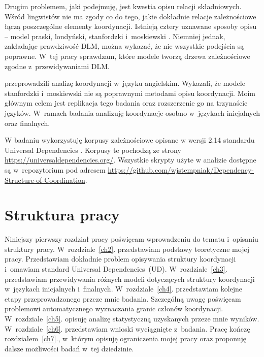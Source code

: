 Drugim problemem, jaki podejmuję, jest kwestia opisu relacji składniowych. Wśród lingwistów nie ma zgody co do tego, jakie dokładnie relacje zależnościowe łączą poszczególne elementy koordynacji. Istnieją cztery uznawane sposoby opisu -- model praski, londyński, stanfordzki i~moskiewski \citep{popel2013coordination, przepiorkowski2023conjunct}. Niemniej jednak, zakładając prawdziwość DLM, można wykazać, że nie wszystkie podejścia są poprawne. W~tej pracy sprawdzam, które modele tworzą drzewa zależnościowe zgodne z~przewidywaniami DLM.

\cite{przepiorkowski2023conjunct} przeprowadzili analizę koordynacji w~języku angielskim. Wykazali, że modele stanfordzki i~moskiewski nie są poprawnymi metodami opisu koordynacji. Moim głównym celem jest replikacja tego badania oraz rozszerzenie go na trzynaście języków. W~ramach badania analizuję koordynacje osobno w~językach inicjalnych oraz finalnych.

W badaniu wykorzystuję korpusy zależnościowe opisane w wersji 2.14 standardu Universal Dependencies \citep{de2021universal}. Korpusy te pochodzą ze strony \url{https://universaldependencies.org/}. 
Wszystkie skrypty użyte w analizie dostępne są w~repozytorium pod adresem \url{https://github.com/wjstempniak/Dependency-Structure-of-Coordination}.

\section{Struktura pracy}

Niniejszy pierwszy rozdział pracy poświęcam wprowadzeniu do tematu i~opisaniu struktury pracy. W~rozdziale~\ref{ch2}. przedstawiam podstawy teoretyczne mojej pracy. Przedstawiam dokładnie problem opisywania struktury koordynacji i~omawiam standard Universal Dependencies~(UD). W~rozdziale~\ref{ch3}. przedstawiam przewidywania różnych modeli dotyczących struktury koordynacji w~językach inicjalnych i~finalnych. W~rozdziale~\ref{ch4}. przedstawiam kolejne etapy przeprowadzonego przeze mnie badania. Szczególną uwagę poświęcam problemowi automatycznego wyznaczania granic członów koordynacji. W~rozdziale~\ref{ch5}. opisuję analizę statystyczną uzyskanych przeze mnie wyników. W~rozdziale~\ref{ch6}. przedstawiam wnioski wyciągnięte z~badania. Pracę kończę rozdziałem~\ref{ch7}., w~którym opisuję ograniczenia mojej pracy oraz proponuję dalsze możliwości badań w~tej dziedzinie.
